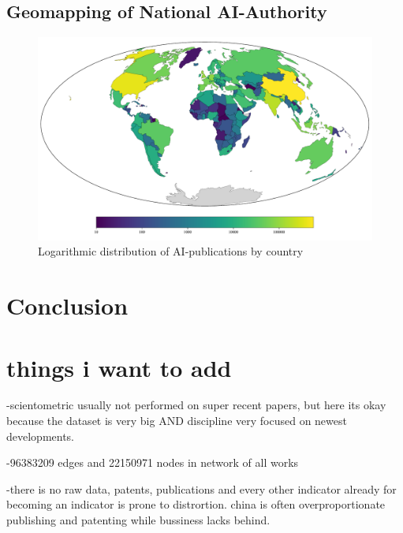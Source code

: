\documentclass{article}
\begin{document}




\subsection{Geomapping of National AI-Authority}

\begin{figure}[!t]
	\centering
	\caption{Logarithmic distribution of AI-publications by country}
	\vspace{1em}
	\includegraphics[width=\linewidth]{country_contributions_aitoff_log.pdf}
\end{figure}

\section{Conclusion}


\section{things i want to add}

-scientometric usually not performed on super recent papers, but here its okay because the dataset is very big AND discipline very focused on newest developments.

-96383209 edges and 22150971 nodes in network of all works

-there is no raw data, patents, publications and every other indicator already for becoming an indicator is prone to distrortion. china is often overproportionate publishing and patenting while bussiness lacks behind.
\end{document}
